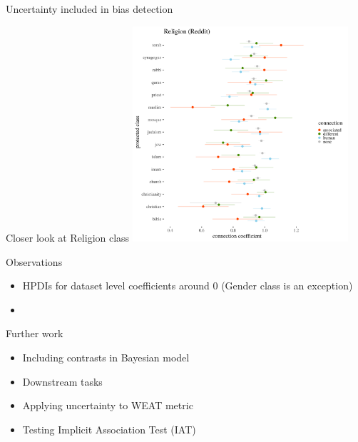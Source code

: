 \documentclass[
  10pt,
  ignorenonframetext,
  x11names, dvipsnames, bibspacing,natbib]{beamer}
\providecommand{\tightlist}{%
  \setlength{\itemsep}{0pt}\setlength{\parskip}{0pt}}
\begin{document}
\begin{frame}{Uncertainty included in bias detection}
\protect\hypertarget{uncertainty-included-in-bias-detection}{}
\begin{block}{Closer look at Religion class}
\protect\hypertarget{closer-look-at-religion-class}{}
\includegraphics[width=8cm]{../images/visReligionReddit.png}
\end{block}
\end{frame}

\begin{frame}{Observations}
\protect\hypertarget{observations}{}
\begin{itemize}
\tightlist
\item
  HPDIs for dataset level coefficients around 0 (Gender class is an
  exception)
\item
\end{itemize}
\end{frame}

\begin{frame}{Further work}
\protect\hypertarget{further-work}{}
\begin{itemize}
\tightlist
\item
  Including contrasts in Bayesian model
\item
  Downstream tasks
\item
  Applying uncertainty to WEAT metric
\item
  Testing Implicit Association Test (IAT)
\end{itemize}
\end{frame}
\end{document}
